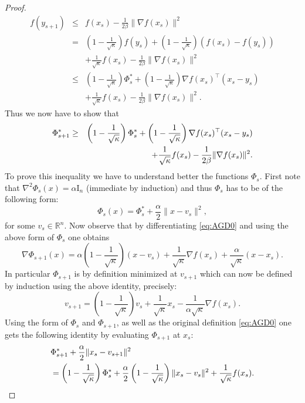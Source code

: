 \documentclass[openany]{now}
\begin{document}
\begin{proof}
\begin{eqnarray*}
f(y_{s+1}) & \leq & f(x_s) - \frac{1}{2 \beta} \| \nabla f(x_s) \|^2 \\
& = & \left(1 - \frac{1}{\sqrt{\kappa}}\right) f(y_s) + \left(1 - \frac{1}{\sqrt{\kappa}}\right)(f(x_s) - f(y_s)) \\
& & + \frac{1}{\sqrt{\kappa}} f(x_s) - \frac{1}{2 \beta} \| \nabla f(x_s) \|^2 \\
& \leq & \left(1 - \frac{1}{\sqrt{\kappa}}\right) \Phi_s^* + \left(1 - \frac{1}{\sqrt{\kappa}}\right) \nabla f(x_s)^{\top} (x_s - y_s) \\
& & + \frac{1}{\sqrt{\kappa}} f(x_s) - \frac{1}{2 \beta} \| \nabla f(x_s) \|^2 .
\end{eqnarray*}
Thus we now have to show that
\begin{eqnarray} 
\Phi_{s+1}^* & \geq & \left(1 - \frac{1}{\sqrt{\kappa}}\right) \Phi_s^* + \left(1 - \frac{1}{\sqrt{\kappa}}\right) \nabla f(x_s)^{\top} (x_s - y_s) \notag \\
& & + \frac{1}{\sqrt{\kappa}} f(x_s) - \frac{1}{2 \beta} \| \nabla f(x_s) \|^2 . \label{eq:AGD3}
\end{eqnarray}
To prove this inequality we have to understand better the functions $\Phi_s$. First note that $\nabla^2 \Phi_s(x) = \alpha \mathrm{I}_n$ (immediate by induction) and thus $\Phi_s$ has to be of the following form:
$$\Phi_s(x) = \Phi_s^* + \frac{\alpha}{2} \|x - v_s\|^2 ,$$
for some $v_s \in \mathbb{R}^n$. Now observe that by differentiating \eqref{eq:AGD0} and using the above form of $\Phi_s$ one obtains
$$\nabla \Phi_{s+1}(x) = \alpha \left(1 - \frac{1}{\sqrt{\kappa}}\right) (x-v_s) + \frac{1}{\sqrt{\kappa}} \nabla f(x_s) + \frac{\alpha}{\sqrt{\kappa}} (x-x_s) .$$
In particular $\Phi_{s+1}$ is by definition minimized at $v_{s+1}$ which can now be defined by induction using the above identity, precisely:
\begin{equation} \label{eq:AGD4}
v_{s+1} = \left(1 - \frac{1}{\sqrt{\kappa}}\right) v_s + \frac{1}{\sqrt{\kappa}} x_s - \frac{1}{\alpha \sqrt{\kappa}} \nabla f(x_s) .
\end{equation}
Using the form of $\Phi_s$ and $\Phi_{s+1}$, as well as the original definition \eqref{eq:AGD0} one gets the following identity by evaluating $\Phi_{s+1}$ at $x_s$:
\begin{align} 
& \Phi_{s+1}^* + \frac{\alpha}{2} \|x_s - v_{s+1}\|^2 \notag \\
& = \left(1 - \frac{1}{\sqrt{\kappa}}\right) \Phi_s^* + \frac{\alpha}{2} \left(1 - \frac{1}{\sqrt{\kappa}}\right) \|x_s - v_s\|^2 + \frac{1}{\sqrt{\kappa}} f(x_s) . \label{eq:AGD5}

\end{align}
\end{proof}
\end{document}
